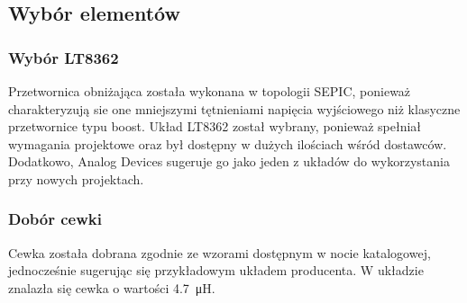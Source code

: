 \documentclass[11pt]{article}
\begin{document}
\begin{figure}[H]
\begin{adjustbox}{width=1.2\textwidth,center}
{

            \label{fig:subfig2}
        }
    \end{adjustbox}
\end{figure}

\subsection{Wybór elementów}
\subsubsection{Wybór LT8362}
Przetwornica obniżająca została wykonana w topologii SEPIC, ponieważ charakteryzują sie one mniejszymi tętnieniami napięcia wyjściowego niż klasyczne przetwornice typu boost. Układ LT8362 został wybrany, ponieważ spełniał wymagania projektowe oraz był dostępny w dużych ilościach wśród dostawców. Dodatkowo, Analog Devices sugeruje go jako jeden z układów do wykorzystania przy nowych projektach.

\subsubsection{Dobór cewki}
Cewka została dobrana zgodnie ze wzorami dostępnym w nocie katalogowej, jednocześnie sugerując się przykładowym układem producenta. W układzie znalazła się cewka o wartości \SI{4.7}{\micro\henry}.
\end{document}
